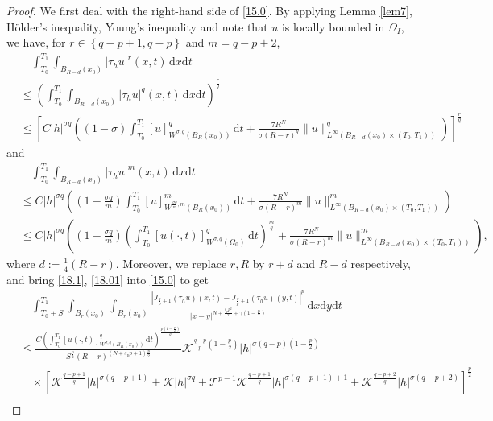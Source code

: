 \documentclass[reqno,10pt]{amsart}
\numberwithin{equation}{section}
\begin{document}
\begin{proof}
	We first deal with the right-hand side of \eqref{15.0}. By applying Lemma \ref{lem7}, H\"{o}lder's inequality, Young's inequality and note that $u$ is locally bounded in $\Omega_I$, we have, for $r\in\left\lbrace q-p+1,q-p\right\rbrace$ and $m=q-p+2$,
	\begin{align}
		\label{18.1}
		&\quad\int_{T_0}^{T_1}\int_{B_{R-d}(x_0)}|\tau_hu|^r(x,t)\,\mathrm{d}x\mathrm{d}t\nonumber\\
		&\le \left( \int_{T_0}^{T_1}\int_{B_{R-d}(x_0)}|\tau_hu|^q(x,t)\,\mathrm{d}x\mathrm{d}t\right)^\frac{r}{q} \nonumber\\
		&\le \left[C|h|^{\sigma q}\left((1-\sigma)\int_{T_0}^{T_1}[u]^q_{W^{\sigma,q}(B_R(x_0))}\,\mathrm{d}t+\frac{7R^N}{\sigma(R-r)^q}\|u\|^q_{L^\infty\left( B_{R-d}(x_0)\times(T_0,T_1)\right) }\right)\right]^\frac{r}{q}
	\end{align}
	and
	\begin{align}
		\label{18.01}
		&\quad\int_{T_0}^{T_1}\int_{B_{R-d}(x_0)}|\tau_hu|^{m}(x,t)\,\mathrm{d}x\mathrm{d}t\nonumber\\
		&\le C|h|^{\sigma q}\left(\left(1-\frac{\sigma q}{m}\right)\int_{T_0}^{T_1}[u]^{m}_{W^{\frac{\sigma q}{m},m}(B_R(x_0))}\,\mathrm{d}t+\frac{7R^N}{\sigma(R-r)^m}\|u\|^m_{L^\infty\left( B_{R-d}(x_0)\times(T_0,T_1)\right) }\right)\nonumber\\
		&\le C|h|^{\sigma q}\left(\left(1-\frac{\sigma q}{m}\right)\left( \int_{T_0}^{T_1}[u(\cdot,t)]^{q}_{W^{\sigma,q}(\Omega_0)}\,\mathrm{d}t\right)^{\frac{m}{q}}+\frac{7R^N}{\sigma(R-r)^m}\|u\|^m_{L^\infty\left( B_{R-d}(x_0)\times(T_0,T_1)\right) }\right),
	\end{align}
	where $d:=\frac{1}{4}(R-r)$. Moreover, we replace $r,R$ by $r+d$ and $R-d$ respectively, and bring \eqref{18.1}, \eqref{18.01} into \eqref{15.0} to get
	\begin{align}
		\label{18.2}
		&\quad\int_{T_0+S}^{T_1}\int_{B_r(x_0)}\int_{B_r(x_0)}\frac{\left|J_{\frac{q}{p}+1}(\tau_hu)(x,t)-J_{\frac{q}{p}+1}(\tau_hu)(y,t)\right|^p}{|x-y|^{N+\frac{s_pp^2}{2}+\gamma\left(1-\frac{p}{2}\right)}}\,\mathrm{d}x\mathrm{d}y\mathrm{d}t\nonumber\\
		&\le \frac{C\left( \int_{T_0}^{T_1}[u(\cdot,t)]^q_{W^{\sigma,q}(B_R(x_0))}\,\mathrm{d}t\right)^{\frac{p\left(1-\frac{p}{2} \right) }{q}}}{S^{\frac{p}{2}}(R-r)^{(N+s_pp+1)\frac{p}{2}}}\mathcal{K}^{\frac{q-p}{p}\left(1-\frac{p}{2}\right)}|h|^{\sigma(q-p)\left( 1-\frac{p}{2}\right) }\nonumber\\
		&\quad\times\left[ \mathcal{K}^{\frac{q-p+1}{q}}|h|^{\sigma(q-p+1)}+\mathcal{K}|h|^{\sigma q}+\mathcal{T}^{p-1}\mathcal{K}^{\frac{q-p+1}{q}}|h|^{\sigma(q-p+1)+1}+\mathcal{K}^{\frac{q-p+2}{q}}|h|^{\sigma(q-p+2)}\right]^\frac{p}{2}\nonumber\\

\end{align}
\end{proof}
\end{document}
